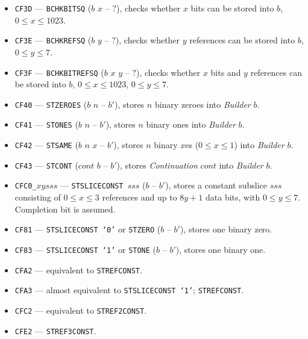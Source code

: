 \documentclass[12pt,oneside]{article}
\begin{document}
\begin{itemize}
\item {\tt CF3D} --- {\tt BCHKBITSQ} ($b$ $x$ -- $?$), checks whether $x$ bits can be stored into $b$, $0\leq x\leq 1023$.
\item {\tt CF3E} --- {\tt BCHKREFSQ} ($b$ $y$ -- $?$), checks whether $y$ references can be stored into $b$, $0\leq y\leq 7$.
\item {\tt CF3F} --- {\tt BCHKBITREFSQ} ($b$ $x$ $y$ -- $?$), checks whether $x$ bits and $y$ references can be stored into $b$, $0\leq x\leq 1023$, $0\leq y\leq 7$.
\item {\tt CF40} --- {\tt STZEROES} ($b$ $n$ -- $b'$), stores $n$ binary zeroes into {\em Builder} $b$.
\item {\tt CF41} --- {\tt STONES} ($b$ $n$ -- $b'$), stores $n$ binary ones into {\em Builder} $b$.
\item {\tt CF42} --- {\tt STSAME} ($b$ $n$ $x$ -- $b'$), stores $n$ binary $x$es ($0\leq x\leq1$) into {\em Builder} $b$.
\item {\tt CF43} --- {\tt STCONT} ($cont$ $b$ -- $b'$), stores {\em Continuation\/} $cont$ into {\em Builder\/} $b$.
\item {\tt CFC0\_$xysss$} --- {\tt STSLICECONST $sss$} ($b$ -- $b'$), stores a constant subslice $sss$ consisting of $0\leq x\leq 3$ references and up to $8y+1$ data bits, with $0\leq y\leq 7$. Completion bit is assumed.
\item {\tt CF81} --- {\tt STSLICECONST `0'} or {\tt STZERO} ($b$ -- $b'$), stores one binary zero.
\item {\tt CF83} --- {\tt STSLICECONST `1'} or {\tt STONE} ($b$ -- $b'$), stores one binary one.
\item {\tt CFA2} --- equivalent to {\tt STREFCONST}.
\item {\tt CFA3} --- almost equivalent to {\tt STSLICECONST `1'}; {\tt STREFCONST}.
\item {\tt CFC2} --- equivalent to {\tt STREF2CONST}.
\item {\tt CFE2} --- {\tt STREF3CONST}.
\end{itemize}
\end{document}
